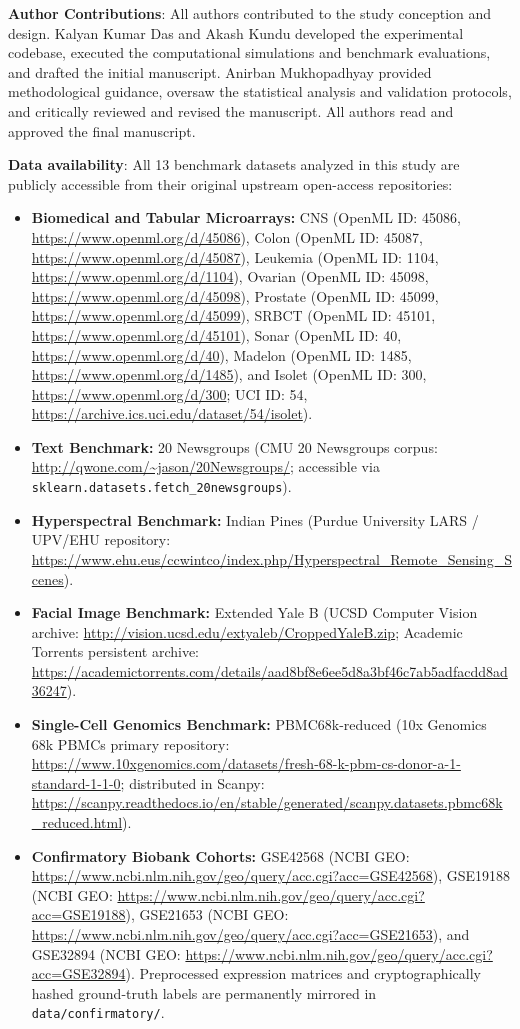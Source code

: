 \documentclass[pdflatex,sn-mathphys-num]{sn-jnl}
\theoremstyle{thmstyleone}
\theoremstyle{thmstyletwo}
\theoremstyle{thmstylethree}
\begin{document}
\textbf{Author Contributions}: All authors contributed to the study conception and design. Kalyan Kumar Das and Akash Kundu developed the experimental codebase, executed the computational simulations and benchmark evaluations, and drafted the initial manuscript. Anirban Mukhopadhyay provided methodological guidance, oversaw the statistical analysis and validation protocols, and critically reviewed and revised the manuscript. All authors read and approved the final manuscript.

\textbf{Data availability}: All 13 benchmark datasets analyzed in this study are publicly accessible from their original upstream open-access repositories:
\begin{itemize}
 \item \textbf{Biomedical and Tabular Microarrays:} CNS (OpenML ID: 45086, \url{https://www.openml.org/d/45086}), Colon (OpenML ID: 45087, \url{https://www.openml.org/d/45087}), Leukemia (OpenML ID: 1104, \url{https://www.openml.org/d/1104}), Ovarian (OpenML ID: 45098, \url{https://www.openml.org/d/45098}), Prostate (OpenML ID: 45099, \url{https://www.openml.org/d/45099}), SRBCT (OpenML ID: 45101, \url{https://www.openml.org/d/45101}), Sonar (OpenML ID: 40, \url{https://www.openml.org/d/40}), Madelon (OpenML ID: 1485, \url{https://www.openml.org/d/1485}), and Isolet (OpenML ID: 300, \url{https://www.openml.org/d/300}; UCI ID: 54, \url{https://archive.ics.uci.edu/dataset/54/isolet}).
 \item \textbf{Text Benchmark:} 20 Newsgroups (CMU 20 Newsgroups corpus: \url{http://qwone.com/~jason/20Newsgroups/}; accessible via \texttt{sklearn.datasets.fetch\_20newsgroups}).
 \item \textbf{Hyperspectral Benchmark:} Indian Pines (Purdue University LARS / UPV/EHU repository: \url{https://www.ehu.eus/ccwintco/index.php/Hyperspectral_Remote_Sensing_Scenes}).
 \item \textbf{Facial Image Benchmark:} Extended Yale B (UCSD Computer Vision archive: \url{http://vision.ucsd.edu/extyaleb/CroppedYaleB.zip}; Academic Torrents persistent archive: \url{https://academictorrents.com/details/aad8bf8e6ee5d8a3bf46c7ab5adfacdd8ad36247}).
 \item \textbf{Single-Cell Genomics Benchmark:} PBMC68k-reduced (10x Genomics 68k PBMCs primary repository: \url{https://www.10xgenomics.com/datasets/fresh-68-k-pbm-cs-donor-a-1-standard-1-1-0}; distributed in Scanpy: \url{https://scanpy.readthedocs.io/en/stable/generated/scanpy.datasets.pbmc68k_reduced.html}).
\item \textbf{Confirmatory Biobank Cohorts:} GSE42568 (NCBI GEO: \url{https://www.ncbi.nlm.nih.gov/geo/query/acc.cgi?acc=GSE42568}), GSE19188 (NCBI GEO: \url{https://www.ncbi.nlm.nih.gov/geo/query/acc.cgi?acc=GSE19188}), GSE21653 (NCBI GEO: \url{https://www.ncbi.nlm.nih.gov/geo/query/acc.cgi?acc=GSE21653}), and GSE32894 (NCBI GEO: \url{https://www.ncbi.nlm.nih.gov/geo/query/acc.cgi?acc=GSE32894}). Preprocessed expression matrices and cryptographically hashed ground-truth labels are permanently mirrored in \texttt{data/confirmatory/}.
\end{itemize}
\end{document}
